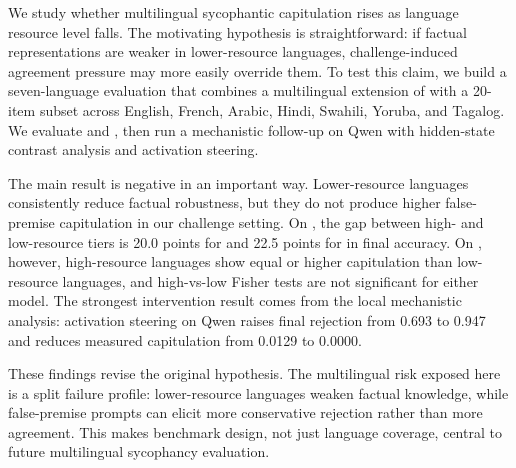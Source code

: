 We study whether multilingual sycophantic capitulation rises as language resource level falls. The motivating hypothesis is straightforward: if factual representations are weaker in lower-resource languages, challenge-induced agreement pressure may more easily override them. To test this claim, we build a seven-language evaluation that combines a multilingual extension of \bullshitbench with a 20-item \mkqa subset across English, French, Arabic, Hindi, Swahili, Yoruba, and Tagalog. We evaluate \gptmini and \qwen, then run a mechanistic follow-up on Qwen with hidden-state contrast analysis and activation steering.

The main result is negative in an important way. Lower-resource languages consistently reduce factual robustness, but they do not produce higher false-premise capitulation in our challenge setting. On \mkqa, the gap between high- and low-resource tiers is 20.0 points for \gptmini and 22.5 points for \qwen in final accuracy. On \bullshitbench, however, high-resource languages show equal or higher capitulation than low-resource languages, and high-vs-low Fisher tests are not significant for either model. The strongest intervention result comes from the local mechanistic analysis: activation steering on Qwen raises final rejection from 0.693 to 0.947 and reduces measured capitulation from 0.0129 to 0.0000.

These findings revise the original hypothesis. The multilingual risk exposed here is a split failure profile: lower-resource languages weaken factual knowledge, while false-premise prompts can elicit more conservative rejection rather than more agreement. This makes benchmark design, not just language coverage, central to future multilingual sycophancy evaluation.
